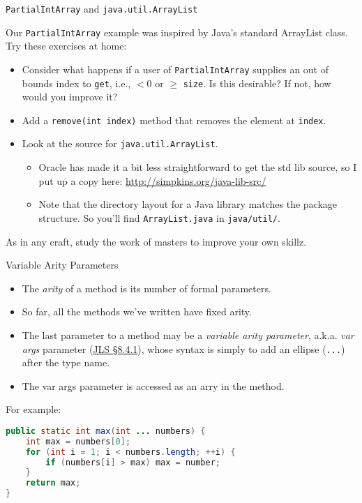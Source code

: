 \documentclass{beamer}
\begin{document}
\begin{frame}[fragile]{{\tt PartialIntArray} and {\tt java.util.ArrayList}}


Our {\tt PartialIntArray} example was inspired by Java's standard ArrayList class.  Try these exercises at home:
\begin{itemize}
\item Consider what happens if a user of {\tt PartialIntArray} supplies an out of bounds index to {\tt get}, i.e., $< 0$ or $\ge$ {\tt size}.  Is this desirable?  If not, how would you improve it?
\item Add a {\tt remove(int index)} method that removes the element at {\tt index}.
\item Look at the source for {\tt java.util.ArrayList}.
\begin{itemize}
\item Oracle has made it a bit less straightforward to get the std lib source, so I put up a copy here: \url{http://simpkins.org/java-lib-src/}
\item Note that the directory layout for a Java library matches the package structure.  So you'll find {\tt ArrayList.java} in {\tt java/util/}.
\end{itemize}
\end{itemize}

As in any craft, study the work of masters to improve your own skillz.

\end{frame}

\begin{frame}[fragile]{Variable Arity Parameters}


\begin{itemize}
\item The {\it arity} of a method is its number of formal parameters.
\item So far, all the methods we've written have fixed arity.
\item The last parameter to a method may be a {\it variable arity parameter}, a.k.a. {\it var args} parameter (\href{http://docs.oracle.com/javase/specs/jls/se7/html/jls-8.html#jls-8.4.1}{JLS \S 8.4.1}), whose syntax is simply to add an ellipse ({\tt ...}) after the type name.
\item The var args parameter is accessed as an arry in the method.
\end{itemize}
For example:
\begin{lstlisting}[language=Java]
public static int max(int ... numbers) {
    int max = numbers[0];
    for (int i = 1; i < numbers.length; ++i) {
        if (numbers[i] > max) max = number;
    }
    return max;
}
\end{lstlisting}

\end{frame}
\end{document}
